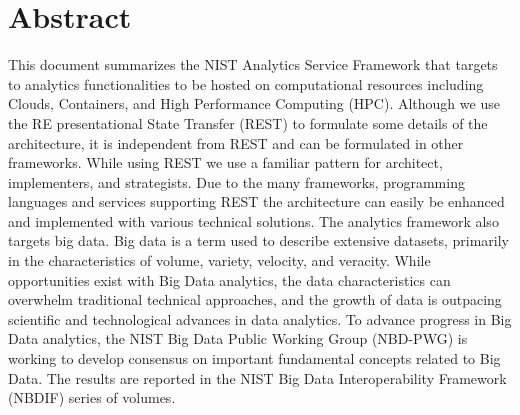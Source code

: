 
\section*{Abstract}

\normalsize This document summarizes the NIST Analytics Service Framework that targets to analytics functionalities to be hosted on computational resources including Clouds, Containers, and High Performance Computing (HPC). Although we use the RE presentational State Transfer (REST) to formulate some details of the architecture, it is independent from REST and can be formulated in other frameworks. While using REST we use a familiar pattern for architect, implementers, and strategists. Due to the many frameworks, programming languages and services supporting REST the architecture can easily be enhanced and implemented with various technical solutions. 
The analytics framework also targets big data. Big data is a term used to describe extensive datasets, primarily in the characteristics of volume, variety, velocity, and veracity. While opportunities exist with Big Data analytics, the data characteristics can overwhelm traditional technical approaches, and the growth of data is outpacing scientific and technological advances in data analytics. To advance progress in Big Data analytics, the NIST Big Data Public Working Group (NBD-PWG) is working to develop consensus on important fundamental concepts related to Big Data. The results are reported in the NIST Big Data Interoperability Framework (NBDIF) series of volumes.\\